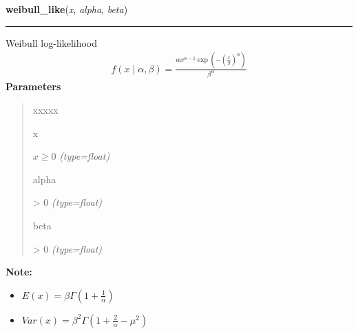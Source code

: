     \label{pymc:distributions:weibull_like}

    \vspace{0.5ex}

\hspace{.8\funcindent}\begin{boxedminipage}{\funcwidth}

    \raggedright \textbf{weibull\_like}(\textit{x}, \textit{alpha}, \textit{beta})

    \vspace{-1.5ex}

    \rule{\textwidth}{1pt}
\setlength{\parskip}{2ex}

Weibull log-likelihood
\begin{equation*}\begin{split}f(x \mid \alpha, \beta) = \frac{\alpha x^{\alpha - 1}\exp(-(\frac{x}{\beta})^{\alpha})}{\beta^\alpha}\end{split}\end{equation*}\setlength{\parskip}{1ex}
      \textbf{Parameters}
      \vspace{-1ex}

      \begin{quote}
        \begin{Ventry}{xxxxx}

          \item[x]


$x \ge 0$
            {\it (type=float)}

          \item[alpha]


{\textgreater} 0
            {\it (type=float)}

          \item[beta]


{\textgreater} 0
            {\it (type=float)}

        \end{Ventry}

      \end{quote}

\textbf{Note:} \begin{itemize}
\item {} 
$E(x)=\beta \Gamma(1+\frac{1}{\alpha})$

\item {} 
$Var(x)=\beta^2 \Gamma(1+\frac{2}{\alpha} - \mu^2)$

\end{itemize}


    \end{boxedminipage}

